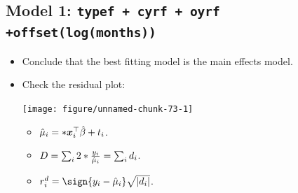 \documentclass{article}\usepackage[]{graphicx}\usepackage[svgnames]{xcolor}
\newenvironment{knitrout}{}{} %
\let\exp\relax%
\let\log\relax%
\DeclarePairedDelimiter\abs{\lvert}{\rvert}
\providecommand{\Vector}[1]{\bm{#1}}%
\begin{document}
\subsection*{Model 1: \texttt{typef + cyrf + oyrf +offset(log(months))}}
\begin{itemize}
    \item Conclude that the best fitting model is the main effects model.
    \item Check the residual plot:
\begin{knitrout}
\color{fgcolor}

{\centering \texttt{[image: figure/unnamed-chunk-73-1]} 

}


\end{knitrout}
          \begin{itemize}
              \item $ \hat{\mu}_i=\exp*{\Vector{x}_i^\top \hat{\beta}+\log{t_i}} $.
              \item $ D=\sum_{i}2\log*{\frac{y_i}{\hat{\mu}_i}}=\sum_i d_i $.
              \item $ r_i^d=\sign{y_i-\hat{\mu}_i}\sqrt{\abs{d_i}} $.
          \end{itemize}
\end{itemize}
\end{document}
